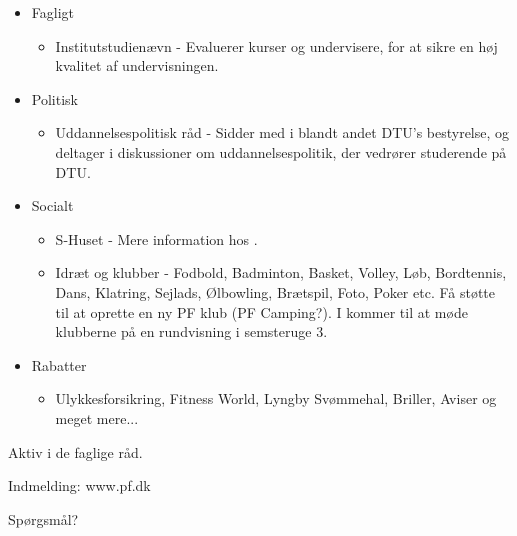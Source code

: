 \begin{itemize}
 \item Fagligt
 \begin{itemize}
  \item Institutstudienævn - Evaluerer kurser og undervisere, for at sikre en høj kvalitet af undervisningen.
 \end{itemize}
 \item Politisk
 \begin{itemize}
  \item Uddannelsespolitisk råd - Sidder med i blandt andet DTU's bestyrelse, og deltager i diskussioner om uddannelsespolitik, der vedrører studerende på DTU.
 \end{itemize}
 \item Socialt
 \begin{itemize}
  \item S-Huset - Mere information hos \Gabriel.
  \item Idræt og klubber - Fodbold, Badminton, Basket, Volley, Løb, Bordtennis, Dans, Klatring, Sejlads, Ølbowling, Brætspil, Foto, Poker etc. Få støtte til at oprette en ny PF klub (PF Camping?). I kommer til at møde klubberne på en rundvisning i semsteruge 3.
 \end{itemize}
 \item Rabatter
 \begin{itemize}
  \item Ulykkesforsikring, Fitness World, Lyngby Svømmehal, Briller, Aviser og meget mere...
 \end{itemize}
\end{itemize}

Aktiv i de faglige råd.

Indmelding: www.pf.dk

Spørgsmål?

